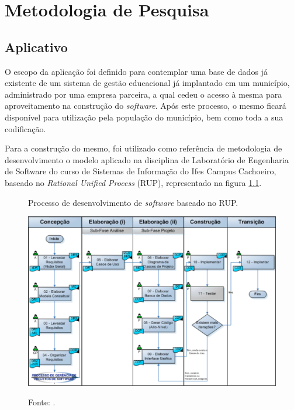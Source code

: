 \chapter{\textbf{Metodologia de Pesquisa}} %
\sloppy %

\section{Aplicativo}

O escopo da aplicação foi definido para contemplar uma base de dados já existente de um sistema de gestão educacional já implantado em um município, administrado por uma empresa parceira, a qual cedeu o acesso à mesma para aproveitamento na construção do \textit{software}. Após este processo, o mesmo ficará disponível para utilização pela população do município, bem como toda a sua codificação.

Para a construção do mesmo, foi utilizado como referência de metodologia de desenvolvimento o modelo aplicado na disciplina de Laboratório de Engenharia de Software do curso de Sistemas de Informação do Ifes Campus Cachoeiro, baseado no \textit{Rational Unified Process} (RUP), representado na figura \ref{figura:rup}. 

\begin{figure}[H]
	\caption{Processo de desenvolvimento de \textit{software} baseado no RUP.}
	\centering %
	\includegraphics[width=16cm]{resources/pds_rup.png} %
	\label{figura:rup}
	\captionsetup{singlelinecheck = false, format= hang, justification=raggedright, labelsep=space, width=16cm}
	\caption*{\footnotesize Fonte: .}
\end{figure}

